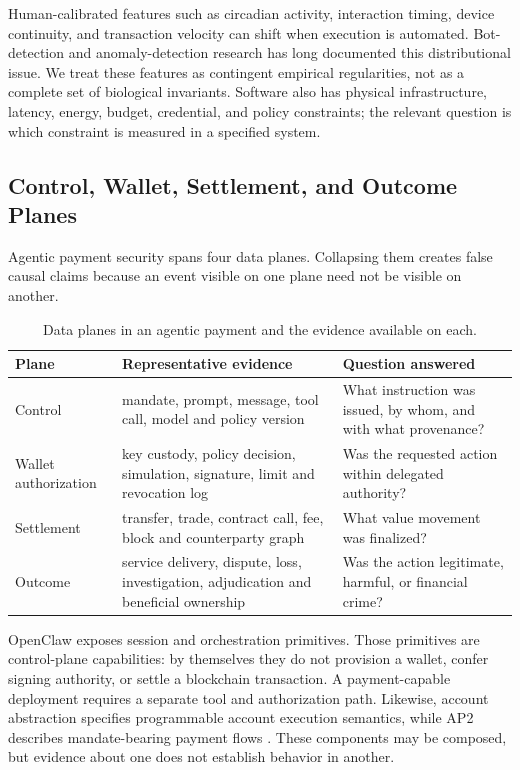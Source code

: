 Human-calibrated features such as circadian activity, interaction timing,
device continuity, and transaction velocity can shift when execution is
automated.  Bot-detection and anomaly-detection research has long documented
this distributional issue\cite{chandola2009,iliou2021,jonker2019}.  We treat
these features as contingent empirical regularities, not as a complete set of
biological invariants.  Software also has physical infrastructure, latency,
energy, budget, credential, and policy constraints; the relevant question is
which constraint is measured in a specified system.

\subsection{Control, Wallet, Settlement, and Outcome Planes}\label{subsec:platforms}

Agentic payment security spans four data planes.  Collapsing them creates false
causal claims because an event visible on one plane need not be visible on
another.

\begin{table}[t]
  \centering
  \caption{Data planes in an agentic payment and the evidence available on each.}
  \label{tab:data_planes}
  \small
  \begin{tabularx}{\textwidth}{@{}p{2.4cm} p{4.1cm} X@{}}
    \toprule
    \textbf{Plane} & \textbf{Representative evidence} & \textbf{Question answered} \\
    \midrule
    Control & mandate, prompt, message, tool call, model and policy version &
      What instruction was issued, by whom, and with what provenance? \\
    Wallet authorization & key custody, policy decision, simulation, signature,
      limit and revocation log & Was the requested action within delegated authority? \\
    Settlement & transfer, trade, contract call, fee, block and counterparty graph &
      What value movement was finalized? \\
    Outcome & service delivery, dispute, loss, investigation, adjudication and
      beneficial ownership & Was the action legitimate, harmful, or financial crime? \\
    \bottomrule
  \end{tabularx}
\end{table}

OpenClaw exposes session and orchestration primitives\cite{openclaw2026}.  Those
primitives are control-plane capabilities: by themselves they do not provision
a wallet, confer signing authority, or settle a blockchain transaction.  A
payment-capable deployment requires a separate tool and authorization path.
Likewise, account abstraction specifies programmable account execution
semantics\cite{erc4337}, while AP2 describes mandate-bearing payment flows
\cite{ap2protocol2025}.  These components may be composed, but evidence about
one does not establish behavior in another.

